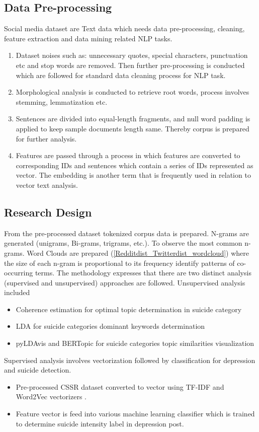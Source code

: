 \documentclass[sn-mathphys,Numbered]{sn-jnl}%
\theoremstyle{thmstyleone}%
\theoremstyle{thmstyletwo}%
\theoremstyle{thmstylethree}%
\begin{document}
\subsection{Data Pre-processing}\label{data_preprocessing}
Social media dataset are Text data which needs data pre-processing, cleaning, feature extraction and data mining related NLP tasks.
\begin{enumerate}[label=(\roman*)]
\item Dataset noises such as: unnecessary quotes, special characters, punctuation etc and stop words are removed. Then further pre-processing is conducted which are followed for standard data cleaning process for NLP task. 
\item Morphological analysis is conducted to retrieve root words, process involves stemming, lemmatization etc.
\item Sentences are divided into equal-length fragments, and null word padding is applied to keep sample documents length same. Thereby corpus is prepared for further analysis.
\item Features are passed through a process in which features are converted to corresponding IDs and sentences which contain a series of IDs represented as vector. The embedding is another term that is frequently used in relation to vector text analysis. 
\end{enumerate}
\subsection{Research Design}
From the pre-processed dataset tokenized corpus data is prepared. N-grams are generated (unigrams, Bi-grams, trigrams, etc.). To observe the most common n-grams. Word Clouds are prepared (\ref{Redditdist_Twitterdist_wordcloud}) where the size of each n-gram is proportional to its frequency identify patterns of co-occurring terms. 
The methodology expresses that there are two distinct analysis (supervised and unsupervised) approaches are followed. 
Unsupervised analysis included 
\begin{itemize}
\item Coherence estimation for optimal topic determination in suicide category
\item LDA for suicide categories dominant keywords determination
\item pyLDAvis and BERTopic for suicide categories topic similarities visualization
\end{itemize}
Supervised analysis involves vectorization followed by classification for depression and suicide detection. 
\begin{itemize}
\item Pre-processed CSSR dataset converted to vector using TF-IDF and Word2Vec vectorizers \cite{aldhyani2022detecting, wang2020depression, shetty2020predicting}. 
\item Feature vector is feed into various machine learning classifier which is trained to determine suicide intensity label in depression post.  
\end{itemize}
\end{document}
